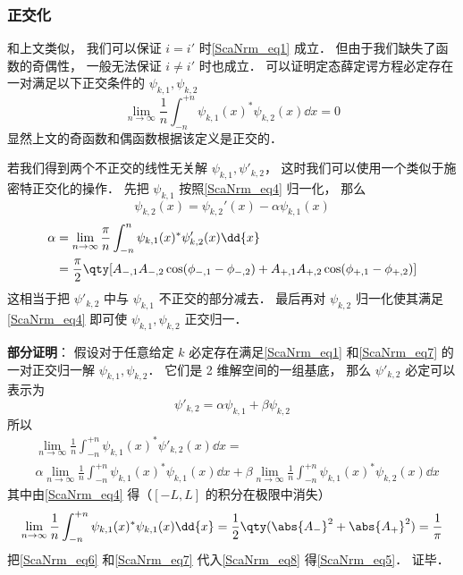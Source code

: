 \subsubsection{正交化}
和上文类似， 我们可以保证 $i = i'$ 时\autoref{ScaNrm_eq1} 成立． 但由于我们缺失了函数的奇偶性， 一般无法保证 $i \ne i'$ 时也成立． 可以证明定态薛定谔方程必定存在一对满足以下正交条件的 $\psi_{k,1}, \psi_{k,2}$
\begin{equation}\label{ScaNrm_eq7}
\lim_{n\to\infty}\frac{1}{n}\int_{-n}^{+n} \psi_{k,1}(x)^* \psi_{k,2}(x) \dd{x} = 0
\end{equation}
显然上文的奇函数和偶函数根据该定义是正交的．

若我们得到两个不正交的线性无关解 $\psi_{k,1}, \psi'_{k,2}$， 这时我们可以使用一个类似于施密特正交化的操作． 先把 $\psi_{k,1}$ 按照\autoref{ScaNrm_eq4} 归一化， 那么
\begin{equation}
\psi_{k,2}(x) = \psi_{k,2}'(x) - \alpha \psi_{k,1}(x)
\end{equation}
\begin{equation}\label{ScaNrm_eq5}
\begin{aligned}
\alpha &= \lim_{n\to\infty} \frac{\pi}{n} \int_{-n}^n \psi_{k,1}(x)^* \psi'_{k,2}(x) \dd{x}\\
&= \frac{\pi}{2} \qty[A_{-,1}A_{-,2}\cos(\phi_{-,1}-\phi_{-,2}) + A_{+,1}A_{+,2}\cos(\phi_{+,1}-\phi_{+,2})]
\end{aligned}
\end{equation}
这相当于把 $\psi'_{k,2}$ 中与 $\psi_{k,1}$ 不正交的部分减去． 最后再对 $\psi_{k,2}$ 归一化使其满足\autoref{ScaNrm_eq4} 即可使 $\psi_{k,1}, \psi_{k,2}$ 正交归一．

\textbf{部分证明}： 假设对于任意给定 $k$ 必定存在满足\autoref{ScaNrm_eq1} 和\autoref{ScaNrm_eq7} 的一对正交归一解 $\psi_{k,1}, \psi_{k,2}$． 它们是 2 维解空间的一组基底， 那么 $\psi'_{k,2}$ 必定可以表示为
\begin{equation}
\psi'_{k,2} = \alpha\psi_{k,1} + \beta\psi_{k,2}
\end{equation}
所以
\begin{equation}\label{ScaNrm_eq8}
\begin{aligned}
&\lim_{n\to\infty}\frac{1}{n}\int_{-n}^{+n} \psi_{k,1}(x)^*\psi'_{k,2}(x)\dd{x}
=\\
&\alpha\lim_{n\to\infty}\frac{1}{n}\int_{-n}^{+n} \psi_{k,1}(x)^*\psi_{k,1}(x)\dd{x}
+ \beta\lim_{n\to\infty}\frac{1}{n}\int_{-n}^{+n} \psi_{k,1}(x)^*\psi_{k,2}(x)\dd{x}
\end{aligned}
\end{equation}
其中由\autoref{ScaNrm_eq4} 得（$[-L,L]$ 的积分在极限中消失）
\begin{equation}\label{ScaNrm_eq6}
\lim_{n\to\infty}\frac{1}{n}\int_{-n}^{+n} \psi_{k,1}(x)^*\psi_{k,1}(x)\dd{x} = \frac{1}{2}\qty(\abs{A_-}^2 + \abs{A_+}^2) = \frac{1}{\pi}
\end{equation}
把\autoref{ScaNrm_eq6} 和\autoref{ScaNrm_eq7} 代入\autoref{ScaNrm_eq8} 得\autoref{ScaNrm_eq5}． 证毕．


